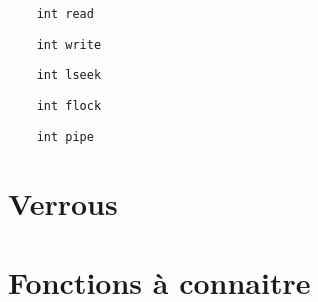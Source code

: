 \documentclass[9pt,twocolumn,a4paper]{article}
\begin{document}
\begin{lstlisting}
    int read
\end{lstlisting}

\begin{lstlisting}
    int write
\end{lstlisting}

\begin{lstlisting}
    int lseek
\end{lstlisting}

\begin{lstlisting}
    int flock
\end{lstlisting}

\begin{lstlisting}
    int pipe
\end{lstlisting}








\section{Verrous}

\section{Fonctions à connaitre}
\end{document}
